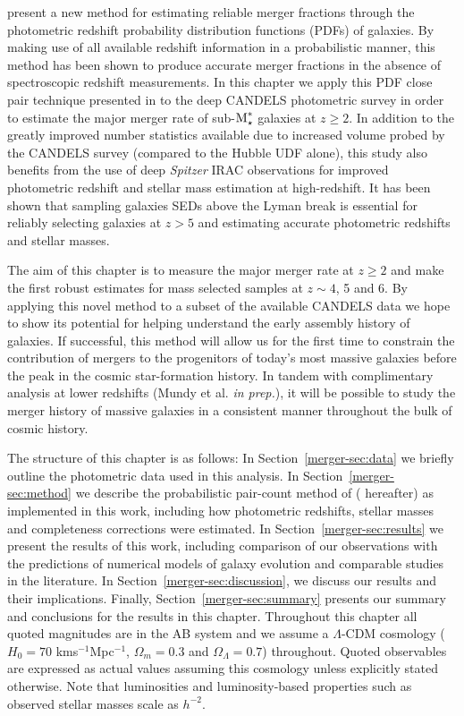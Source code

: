 \citet{LopezSanjuan:2014uj} present a new method for estimating reliable merger fractions through the photometric redshift probability distribution functions (PDFs) of galaxies. By making use of all available redshift information in a probabilistic manner, this method has been shown to produce accurate merger fractions in the absence of spectroscopic redshift measurements. In this chapter we apply this PDF close pair technique presented in \citet{LopezSanjuan:2014uj} to the deep CANDELS \citep{2011ApJS..197...35G,Koekemoer:2011br} photometric survey in order to estimate the major merger rate of sub-$\text{M}_{\star}^{*}$ galaxies at $z \geq 2$. In addition to the greatly improved number statistics available due to increased volume probed by the CANDELS survey (compared to the Hubble UDF alone), this study also benefits from the use of deep \emph{Spitzer} IRAC observations for improved photometric redshift and stellar mass estimation at high-redshift. It has been shown that sampling galaxies SEDs above the Lyman break is essential for reliably selecting galaxies at $z >5$ \citep{2011MNRAS.418.2074M} and estimating accurate photometric redshifts and stellar masses. 

The aim of this chapter is to measure the major merger rate at $z \geq 2$ and make the first robust estimates for mass selected samples at $z\sim4$, 5 and 6.  By applying this novel method to a subset of the available CANDELS data we hope to show its potential for helping understand the early assembly history of galaxies. If successful, this method will allow us for the first time to constrain the contribution of mergers to the progenitors of today's most massive galaxies before the peak in the cosmic star-formation history. In tandem with complimentary analysis at lower redshifts (Mundy et al. \emph{in prep.}), it will be possible to study the merger history of massive galaxies in a consistent manner throughout the bulk of cosmic history.

The structure of this chapter is as follows: In Section~\ref{merger-sec:data} we briefly outline the photometric data used in this analysis. In Section~\ref{merger-sec:method} we describe the probabilistic pair-count method of \citet{LopezSanjuan:2014uj} ( hereafter) as implemented in this work, including how photometric redshifts, stellar masses and completeness corrections were estimated. In Section~\ref{merger-sec:results} we present the results of this work, including comparison of our observations with the predictions of numerical models of galaxy evolution and comparable studies in the literature. In Section~\ref{merger-sec:discussion}, we discuss our results and their implications. Finally, Section~\ref{merger-sec:summary} presents our summary and conclusions for the results in this chapter. 
Throughout this chapter all quoted magnitudes are in the AB system \citep{1983ApJ...266..713O} and we assume a $\Lambda$-CDM cosmology ($H_{0} = 70$ kms$^{-1}$Mpc$^{-1}$, $\Omega_{m}=0.3$ and $\Omega_{\Lambda}=0.7$) throughout. Quoted observables are expressed as actual values assuming this cosmology unless explicitly stated otherwise. Note that luminosities and luminosity-based properties such as observed stellar masses scale as $h^{-2}$.

